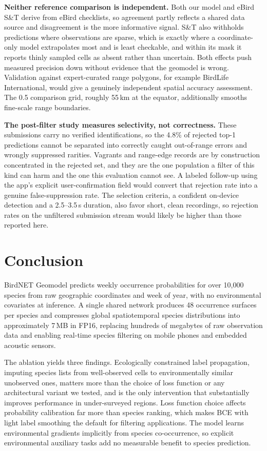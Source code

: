 \textbf{Neither reference comparison is independent.} Both our model and eBird S\&T derive from eBird checklists, so agreement partly reflects a shared data source and disagreement is the more informative signal. S\&T also withholds predictions where observations are sparse, which is exactly where a coordinate-only model extrapolates most and is least checkable, and within its mask it reports thinly sampled cells as absent rather than uncertain. Both effects push measured precision down without evidence that the geomodel is wrong. Validation against expert-curated range polygons, for example BirdLife International, would give a genuinely independent spatial accuracy assessment. The 0.5\textdegree{} comparison grid, roughly 55\,km at the equator, additionally smooths fine-scale range boundaries.

\textbf{The post-filter study measures selectivity, not correctness.} These submissions carry no verified identifications, so the 4.8\% of rejected top-1 predictions cannot be separated into correctly caught out-of-range errors and wrongly suppressed rarities. Vagrants and range-edge records are by construction concentrated in the rejected set, and they are the one population a filter of this kind can harm and the one this evaluation cannot see. A labeled follow-up using the app's explicit user-confirmation field would convert that rejection rate into a genuine false-suppression rate. The selection criteria, a confident on-device detection and a 2.5--3.5\,s duration, also favor short, clean recordings, so rejection rates on the unfiltered submission stream would likely be higher than those reported here.


\section{Conclusion}
\label{sec:conclusion}

BirdNET Geomodel predicts weekly occurrence probabilities for over 10,000 species from raw geographic coordinates and week of year, with no environmental covariates at inference. A single shared network produces 48 occurrence surfaces per species and compresses global spatiotemporal species distributions into approximately 7\,MB in FP16, replacing hundreds of megabytes of raw observation data and enabling real-time species filtering on mobile phones and embedded acoustic sensors.

The ablation yields three findings. Ecologically constrained label propagation, imputing species lists from well-observed cells to environmentally similar unobserved ones, matters more than the choice of loss function or any architectural variant we tested, and is the only intervention that substantially improves performance in under-surveyed regions. Loss function choice affects probability calibration far more than species ranking, which makes BCE with light label smoothing the default for filtering applications. The model learns environmental gradients implicitly from species co-occurrence, so explicit environmental auxiliary tasks add no measurable benefit to species prediction.

